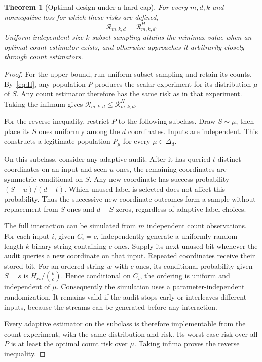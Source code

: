 \documentclass[conference]{IEEEtran}
\newtheorem{theorem}{Theorem}
\newcommand{\simplex}{\Delta_d}
\begin{document}
\begin{theorem}[Optimal design under a hard cap]\label{thm:reduction}
For every $m,d,k$ and nonnegative loss for which these risks are defined,
\begin{equation}\label{eq:reduction}
 \mathcal R_{m,k,d}=\mathcal R^{H}_{m,k,d}.
\end{equation}
Uniform independent size-$k$ subset sampling attains the minimax value when an optimal count estimator exists, and otherwise approaches it arbitrarily closely through count estimators.
\end{theorem}
\begin{proof}
For the upper bound, run uniform subset sampling and retain its counts. By~\eqref{eq:H}, any population $P$ produces the scalar experiment for its distribution $\mu$ of $S$. Any count estimator therefore has the same risk as in that experiment. Taking the infimum gives $\mathcal R_{m,k,d}\leq\mathcal R^H_{m,k,d}$.

For the reverse inequality, restrict $P$ to the following subclass. Draw $S\sim\mu$, then place its $S$ ones uniformly among the $d$ coordinates. Inputs are independent. This constructs a legitimate population $P_\mu$ for every $\mu\in\simplex$.

On this subclass, consider any adaptive audit. After it has queried $t$ distinct coordinates on an input and seen $u$ ones, the remaining coordinates are symmetric conditional on $S$. Any new coordinate has success probability $(S-u)/(d-t)$. Which unused label is selected does not affect this probability. Thus the successive new-coordinate outcomes form a sample without replacement from $S$ ones and $d-S$ zeros, regardless of adaptive label choices.

The full interaction can be simulated from $m$ independent count observations. For each input $i$, given $C_i=c$, independently generate a uniformly random length-$k$ binary string containing $c$ ones. Supply its next unused bit whenever the audit queries a new coordinate on that input. Repeated coordinates receive their stored bit. For an ordered string $w$ with $c$ ones, its conditional probability given $S=s$ is $H_{cs}/\binom{k}{c}$. Hence conditional on $C_i$, the ordering is uniform and independent of $\mu$. Consequently the simulation uses a parameter-independent randomization. It remains valid if the audit stops early or interleaves different inputs, because the streams can be generated before any interaction.

Every adaptive estimator on the subclass is therefore implementable from the count experiment, with the same distribution and risk. Its worst-case risk over all $P$ is at least the optimal count risk over $\mu$. Taking infima proves the reverse inequality.
\end{proof}
\end{document}

